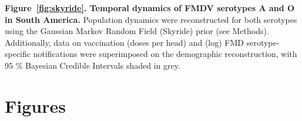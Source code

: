 \documentclass[10pt]{article}
\begin{document}
{\bf Figure~\ref{fig:skyride}. Temporal dynamics of FMDV serotypes A and O in South America.} Population dynamics were reconstructed for both serotypes using the Gaussian Markov Random Field (Skyride) prior (see Methods).
Additionally, data on vaccination  (doses per head) and (log) FMD serotype-specific notifications were superimposed on the demographic reconstruction, with 95 \% Bayesian Credible Intervals shaded in grey.
\newpage
\section{Figures}
\begin{figure}[!ht]
\begin{center}
\\
\end{center}
\caption{}
\label{fig:trees}
\end{figure}
\end{document}
